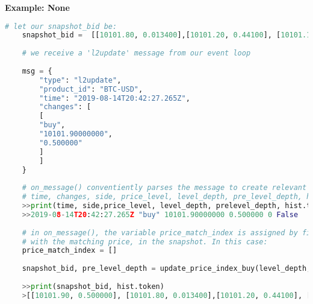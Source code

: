 \textbf{Example: None}
\begin{lstlisting}[language=Python]
	# let our snapshot_bid be:
	snapshot_bid =  [[10101.80, 0.013400],[10101.20, 0.44100], [10101.10, 0.450541]]
	
	# we receive a 'l2update' message from our event loop
	
	msg = {
		"type": "l2update",
		"product_id": "BTC-USD",
		"time": "2019-08-14T20:42:27.265Z",
		"changes": [
		[
		"buy",
		"10101.90000000",
		"0.500000"
		]
		]
	}
	
	# on_message() conventiently parses the message to create relevant local variables
	# time, changes, side, price_level, level_depth, pre_level_depth, hist.token
	>>print(time, side,price_level, level_depth, prelevel_depth, hist.token)
	>>2019-08-14T20:42:27.265Z "buy" 10101.90000000 0.500000 0 False
	
	# in on_message(), the variable price_match_index is assigned by finding the index
	# with the matching price, in the snapshot. In this case:
	price_match_index = [] 
	
	snapshot_bid, pre_level_depth = update_price_index_buy(level_depth, price_level, pre_level_depth)
	
	>>print(snapshot_bid, hist.token)
	>[[10101.90, 0.500000], [10101.80, 0.013400],[10101.20, 0.44100], [10101.10, 0.450541]] True
\end{lstlisting}